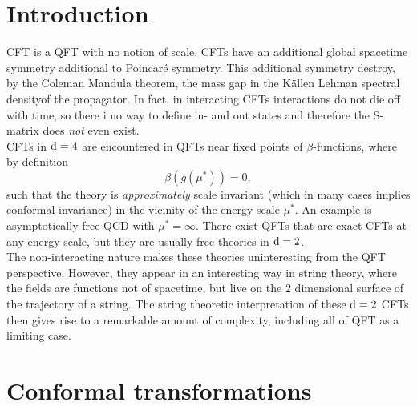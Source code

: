 \section{Introduction}
CFT is a QFT with no notion of scale. CFTs have an additional global spacetime symmetry additional to Poincaré symmetry. This additional symmetry destroy, by the Coleman Mandula theorem, the mass gap in the Källen Lehman spectral densityof the propagator. In fact, in interacting CFTs interactions do not die off with time, so there i no way to define in- and out states and therefore the S-matrix does \emph{not} even exist.\\
CFTs in $\mathrm{d}=4$ are encountered in QFTs near fixed points of $\beta$-functions, where by definition
\begin{equation*}
	\beta(g(\mu^*)) = 0,
\end{equation*}
such that the theory is \emph{approximately} scale invariant (which in many cases implies conformal invariance) in the vicinity of the energy scale $\mu^*$. An example is asymptotically free QCD with $\mu^*=\infty$. There exist QFTs that are exact CFTs at any energy scale, but they are usually free theories in $\mathrm{d}=2$.\\
The non-interacting nature makes these theories uninteresting from the QFT perspective. However, they appear in an interesting way in string theory, where the fields are functions not of spacetime, but live on the $2$ dimensional surface of the trajectory of a string. The string theoretic interpretation of these $\mathrm{d}=2$ CFTs then gives rise to a remarkable amount of complexity, including all of QFT as a limiting case.




\section{Conformal transformations}


